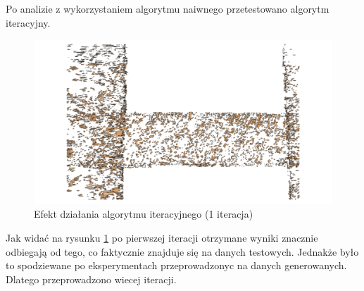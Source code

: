 Po analizie z wykorzystaniem algorytmu naiwnego przetestowano algorytm iteracyjny.

\begin{figure}[h!]
    \centering
    \includegraphics[width=0.5\linewidth]{img/wynik_iter1.png}
    \caption{Efekt działania algorytmu iteracyjnego (1 iteracja)}
    \label{fig:wynik_iteracyjny}
\end{figure}

Jak widać na rysunku \ref{fig:wynik_iteracyjny} po pierwszej iteracji otrzymane wyniki
znacznie odbiegają od tego, co faktycznie znajduje się na danych testowych. Jednakże
było to spodziewane po eksperymentach przeprowadzonyc na danych generowanych. Dlatego przeprowadzono
wiecej iteracji.

